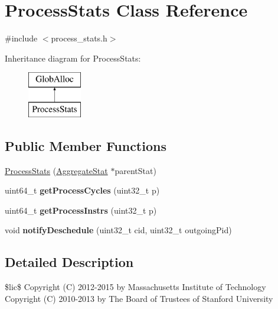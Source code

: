 \hypertarget{classProcessStats}{\section{Process\-Stats Class Reference}
\label{classProcessStats}
}


{\ttfamily \#include $<$process\-\_\-stats.\-h$>$}

Inheritance diagram for Process\-Stats\-:\begin{figure}[H]
\begin{center}
\leavevmode
\includegraphics[height=2.000000cm]{classProcessStats}
\end{center}
\end{figure}
\subsection*{Public Member Functions}
\begin{DoxyCompactItemize}
\item 
\hyperlink{classProcessStats_ada49d8374a41fa144bc16d3d403b16b1}{Process\-Stats} (\hyperlink{classAggregateStat}{Aggregate\-Stat} $\ast$parent\-Stat)
\item 
\hypertarget{classProcessStats_ad64f6bcac81df075ec8965c0246bb5e6}{uint64\-\_\-t {\bfseries get\-Process\-Cycles} (uint32\-\_\-t p)}\label{classProcessStats_ad64f6bcac81df075ec8965c0246bb5e6}

\item 
\hypertarget{classProcessStats_a63231a33cbc3b3f68dd3fb4d3331b5f8}{uint64\-\_\-t {\bfseries get\-Process\-Instrs} (uint32\-\_\-t p)}\label{classProcessStats_a63231a33cbc3b3f68dd3fb4d3331b5f8}

\item 
\hypertarget{classProcessStats_a5853010f79c18d5becd073db341f6a5b}{void {\bfseries notify\-Deschedule} (uint32\-\_\-t cid, uint32\-\_\-t outgoing\-Pid)}\label{classProcessStats_a5853010f79c18d5becd073db341f6a5b}

\end{DoxyCompactItemize}


\subsection{Detailed Description}
\$lic\$ Copyright (C) 2012-\/2015 by Massachusetts Institute of Technology Copyright (C) 2010-\/2013 by The Board of Trustees of Stanford University

